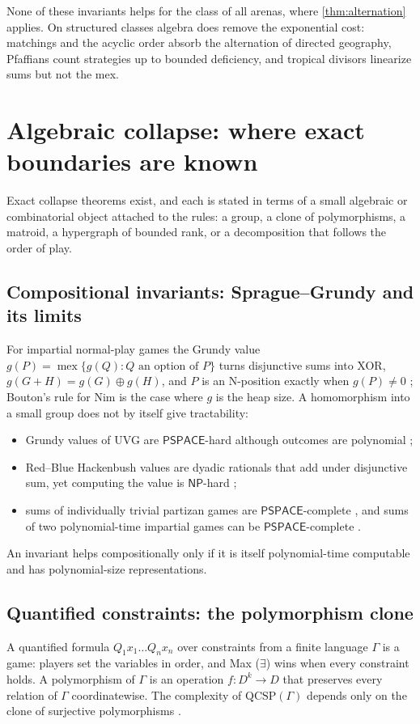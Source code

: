 \documentclass[11pt]{amsart}
\theoremstyle{plain}
\theoremstyle{definition}
\theoremstyle{remark}
\numberwithin{equation}{section}
\newcommand{\cls}[1]{\mathsf{#1}}
\newcommand{\PSPACE}{\cls{PSPACE}}
\newcommand{\NP}{\cls{NP}}
\begin{document}
None of these invariants helps for the class of all arenas, where \cref{thm:alternation} applies. On structured classes algebra does remove the exponential cost: matchings and the acyclic order absorb the alternation of directed geography, Pfaffians count strategies up to bounded deficiency, and tropical divisors linearize sums but not the mex.

\section{Algebraic collapse: where exact boundaries are known}\label{sec:algebraic}

Exact collapse theorems exist, and each is stated in terms of a small algebraic or combinatorial object attached to the rules: a group, a clone of polymorphisms, a matroid, a hypergraph of bounded rank, or a decomposition that follows the order of play.

\subsection{Compositional invariants: Sprague--Grundy and its limits}
For impartial normal-play games the Grundy value $g(P)=\operatorname{mex}\{g(Q):Q\text{ an option of }P\}$ turns disjunctive sums into XOR, $g(G+H)=g(G)\oplus g(H)$, and $P$ is an N-position exactly when $g(P)\ne0$ \cite{Sprague,Grundy}; Bouton's rule for Nim \cite{Bouton} is the case where $g$ is the heap size. A homomorphism into a small group does not by itself give tractability:
\begin{itemize}
\item Grundy values of UVG are $\PSPACE$-hard although outcomes are polynomial \cite{BFT};
\item Red--Blue Hackenbush values are dyadic rationals that add under disjunctive sum, yet computing the value is $\NP$-hard \cite{WinningWays,DemaineHearn};
\item sums of individually trivial partizan games are $\PSPACE$-complete \cite{Morris}, and sums of two polynomial-time impartial games can be $\PSPACE$-complete \cite{BFT}.
\end{itemize}
An invariant helps compositionally only if it is itself polynomial-time computable and has polynomial-size representations.

\subsection{Quantified constraints: the polymorphism clone}\label{ssec:qcsp}
A quantified formula $Q_1x_1\dots Q_nx_n$ over constraints from a finite language $\Gamma$ is a game: players set the variables in order, and Max ($\exists$) wins when every constraint holds. A polymorphism of $\Gamma$ is an operation $f\colon D^k\to D$ that preserves every relation of $\Gamma$ coordinatewise. The complexity of $\mathrm{QCSP}(\Gamma)$ depends only on the clone of surjective polymorphisms \cite{BBCJK}.
\end{document}
